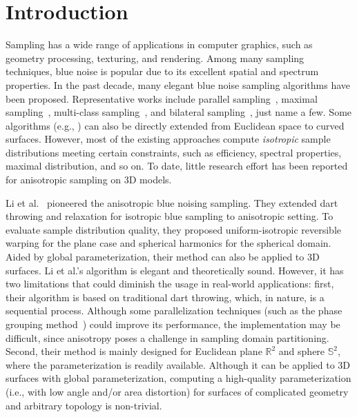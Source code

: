 \section{Introduction}

  Sampling has a wide range of applications in computer graphics, such as geometry processing, texturing, and rendering.
  Among many sampling techniques, blue noise is popular due to its excellent spatial and spectrum properties.
  In the past decade, many elegant blue noise sampling algorithms have been proposed.
  Representative works include parallel sampling~\cite{Wei:2008:PPD:1399504.1360619},
  maximal sampling~\cite{Ebeida:2011:EMP:2010324.1964944,Yan:2013:GPA:2516971.2516973},
  multi-class sampling~\cite{Wei:2010:MBN:1833351.1778816}, and bilateral sampling~\cite{Chen:2013:BBN:2508363.2508375}, just name a few.
  Some algorithms (e.g., \cite{Bowers:2010:PPD:1882261.1866188}\cite{DBLP:journals/tvcg/YingXS013}) can also be directly extended from Euclidean space to curved surfaces.
  However, most of the existing approaches compute \textit{isotropic} sample distributions meeting certain constraints,
  such as efficiency, spectral properties, maximal distribution, and so on.
  To date, little research effort has been reported for anisotropic sampling on 3D models.

  Li et al.~\cite{li:anisotropic:2010} pioneered the anisotropic blue noising sampling.
  They extended dart throwing and relaxation for isotropic blue sampling to anisotropic setting.
  To evaluate sample distribution quality, they proposed uniform-isotropic reversible warping for the plane case and spherical harmonics for the spherical domain.
  Aided by global parameterization, their method can also be applied to 3D surfaces.
  Li et al.'s algorithm is elegant and theoretically sound.
  However, it has two limitations that could diminish the usage in real-world applications:
  first, their algorithm is based on traditional dart throwing, which, in nature, is a sequential process.
  Although some parallelization techniques (such as the phase grouping method~\cite{Wei:2008:PPD:1399504.1360619}) could improve its performance,
  the implementation may be difficult, since anisotropy poses a challenge in sampling domain partitioning.
  Second, their method is mainly designed for Euclidean plane $\mathbb{R}^2$ and sphere $\mathbb{S}^2$,
  where the parameterization is readily available.
  Although it can be applied to 3D surfaces with global parameterization, computing a high-quality parameterization
  (i.e., with low angle and/or area distortion) for surfaces of complicated geometry and arbitrary topology is non-trivial.

